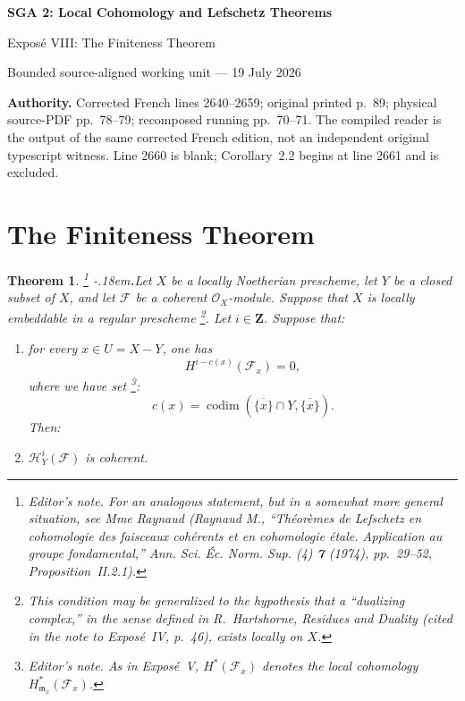 \documentclass[10pt,a4paper]{article}
\theoremstyle{sgatheorem}
\newtheorem{theorem}{Theorem}[section]
\numberwithin{equation}{section}
\newcommand{\ZZ}{\mathbf Z}
\newcommand{\OX}{\mathcal O_X}
\newcommand{\cF}{\mathcal F}
\newcommand{\markedfootnote}[2]{%
  \begingroup\renewcommand{\thefootnote}{#1}\footnote{#2}\endgroup}
\begin{document}
\begin{center}
  {\Large\bfseries SGA 2: Local Cohomology and Lefschetz Theorems}\par\smallskip
  {\large Expos\'e VIII: The Finiteness Theorem}\par
  \small Bounded source-aligned working unit --- 19 July 2026
\end{center}
\noindent\colorbox{softgray}{\parbox{0.95\linewidth}{\footnotesize\textbf{Authority.}
Corrected French lines 2640--2659; original printed p.~89; physical
source-PDF pp.~78--79; recomposed running pp.~70--71. The compiled reader is
the output of the same corrected French edition, not an independent original
typescript witness. Line 2660 is blank; Corollary~2.2 begins at line 2661 and
is excluded.}}

\setcounter{section}{1}
\section{The Finiteness Theorem}\label{VIII.2}

\begin{theorem}\label{VIII.2.1}
\markedfootnote{(1)}{\textit{Editor's note.} For an analogous statement, but
in a somewhat more general situation, see Mme Raynaud (Raynaud M., ``Th\'eor\`emes de
Lefschetz en cohomologie des faisceaux coh\'erents et en cohomologie
\'etale. Application au groupe fondamental,'' \emph{Ann. Sci. \'Ec. Norm.
Sup.} (4) \textbf{7} (1974), pp.~29--52, Proposition~II.2.1).}%
\kern-.18em\textbf{.}\enspace Let $X$ be a locally Noetherian prescheme, let $Y$ be a closed subset of $X$,
and let $\cF$ be a coherent $\OX$-module. Suppose that $X$ is locally
embeddable in a regular prescheme\markedfootnote{*}{This condition may be
generalized to the hypothesis that a ``dualizing complex,'' in the sense
defined in R.~Hartshorne, \emph{Residues and Duality} (cited in the note to
Expos\'e~IV, p.~46), exists locally on $X$.}. Let $i\in\ZZ$. Suppose that:
\begin{enumerate}[label=\textup{\alph*)},leftmargin=2.2em,itemsep=0.5\baselineskip]
\item for every $x\in U=X-Y$, one has
\begin{equation*}
  H^{i-c(x)}(\cF_x)=0,
\end{equation*}
where we have set\markedfootnote{(2)}{\textit{Editor's note.} As in
Expos\'e~V, $H^{\ast}(\cF_x)$ denotes the local cohomology
$H^{\ast}_{\mathfrak m_x}(\cF_x)$.}:
\begin{equation}\label{eq:VIII.2.1}
  c(x)=\operatorname{codim}
  (\overline{\{x\}}\cap Y,\overline{\{x\}}).
\end{equation}
Then:
\item $\mathcal H^i_Y(\cF)$ is coherent.
\end{enumerate}
\end{theorem}
\end{document}
